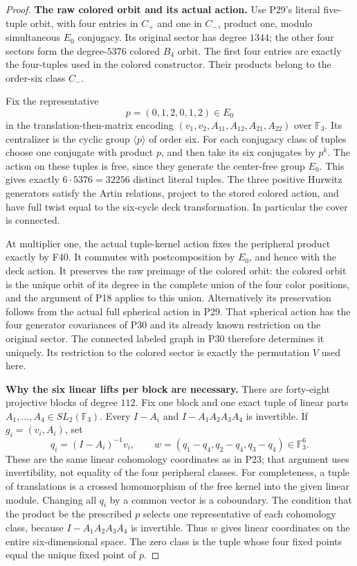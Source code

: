 \begin{proof}
\medskip\noindent\textbf{The raw colored orbit and its actual action.}\quad
Use P29's literal five-tuple orbit, with four entries in
$C_+$ and one in $C_-$, product one, modulo simultaneous
$E_0$ conjugacy. Its original sector has degree $1344$;
the other four sectors form the degree-$5376$ colored
$B_4$ orbit. The first four entries are exactly the
four-tuples used in the colored constructor. Their products
belong to the order-six class $C_-$.

Fix the representative
\[
 p=(0,1,2,0,1,2)\in E_0
\]
in the translation-then-matrix encoding
$(v_1,v_2,A_{11},A_{12},A_{21},A_{22})$ over $\mathbb F_3$.
Its centralizer is the cyclic group $\langle p\rangle$ of
order six. For each conjugacy class of tuples choose one
conjugate with product $p$, and then take its six conjugates
by $p^k$. The action on these tuples is free, since they
generate the center-free group $E_0$. This gives exactly
$6\cdot5376=32256$ distinct literal tuples. The three
positive Hurwitz generators satisfy the Artin relations,
project to the stored colored action, and have full twist
equal to the six-cycle deck transformation. In particular
the cover is connected.

At multiplier one, the actual tuple-kernel action fixes the
peripheral product exactly by F40. It commutes with
postcomposition by $E_0$, and hence with the deck action.
It preserves the raw preimage of the colored orbit: the
colored orbit is the unique orbit of its degree in the
complete union of the four color positions, and the argument
of P18 applies to this union. Alternatively its preservation
follows from the actual full spherical action in P29.
That spherical action has the four generator covariances of
P30 and its already known restriction on the original sector.
The connected labeled graph in P30 therefore determines it
uniquely. Its restriction to the colored sector is exactly
the permutation $V$ used here.

\medskip\noindent\textbf{Why the six linear lifts per block are necessary.}\quad
There are forty-eight projective blocks of degree $112$.
Fix one block and one exact tuple of linear parts
$A_1,\ldots,A_4\in SL_2(\mathbb F_3)$. Every $I-A_i$
and $I-A_1A_2A_3A_4$ is invertible. If
$g_i=(v_i,A_i)$, set
\[
 q_i=(I-A_i)^{-1}v_i,\qquad
 w=(q_1-q_4,q_2-q_4,q_3-q_4)\in\mathbb F_3^6.
\]
These are the same linear cohomology coordinates as in P23;
that argument uses invertibility, not equality of the four
peripheral classes. For completeness, a tuple of translations
is a crossed homomorphism of the free kernel into the given
linear module. Changing all $q_i$ by a common vector is a
coboundary. The condition that the product be the prescribed
$p$ selects one representative of each cohomology class,
because $I-A_1A_2A_3A_4$ is invertible. Thus $w$ gives
linear coordinates on the entire six-dimensional space.
The zero class is the tuple whose four fixed points equal
the unique fixed point of $p$.


\end{proof}
